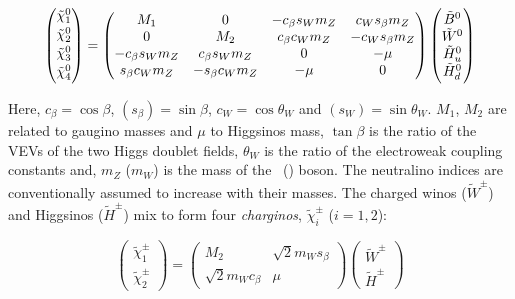				\begin{equation}
				\label{eq:neutralino_mixing}
					\begin{pmatrix}  \ninoone \\ \ninotwo \\ \ninothree \\ \ninofour \end{pmatrix}	
					= 
					\begin{pmatrix}
						M_1 & 0 & - c_\beta s_W m_Z &  c_W s_\beta m_Z  \\
						0 & M_2 & c_\beta c_W m_Z  &  - c_W s_\beta m_Z \\
						- c_\beta s_W m_Z  & c_\beta s_W m_Z  & 0 & - \mu \\ 
						s_\beta c_W m_Z  & - s_\beta c_W m_Z & - \mu & 0  
					\end{pmatrix}
					\begin{pmatrix}
						\tilde{B}^{0} \\
						\tilde{W}^{0} \\
						\tilde{H}^{0}_u \\
						\tilde{H}^{0}_d
					\end{pmatrix}
				\end{equation}

				\noindent Here, $c_{\beta} = \cos \beta$,  $(s_{\beta}) = \sin \beta$, $c_W = \cos \theta_W$ and $(s_W) = \sin \theta_W$. $M_1$, $M_2$ are related to gaugino masses and $\mu$ to Higgsinos mass, $\tan \beta$ is the ratio of the \ac{VEV}s of the two Higgs doublet fields, $\theta_W$ is the ratio of the electroweak coupling constants and, $m_Z$ ($m_W$) is the mass of the \Zboson\ (\Wboson) boson. The neutralino indices are conventionally assumed to increase with their masses. The charged winos ($\tilde{W}^{\pm}$) and Higgsinos ($\tilde{H}^{\pm}$) mix to form four \textit{charginos}, $\tilde{\chi}^{\pm}_i$ ($i=1,2$):

				\begin{equation}
				\label{eq:chargino_mixing}
						\begin{pmatrix}  \tilde{\chi}^{\pm}_1 \\ \tilde{\chi}^{\pm}_2 \end{pmatrix}	
						= 
						\begin{pmatrix}
							M_2 & \sqrt{2} m_W s_\beta \\
							\sqrt{2} m_W c_\beta & \mu  
						\end{pmatrix}
						\begin{pmatrix}
							\tilde{W}^{\pm} \\
							\tilde{H}^{\pm}
						\end{pmatrix}
				\end{equation}

